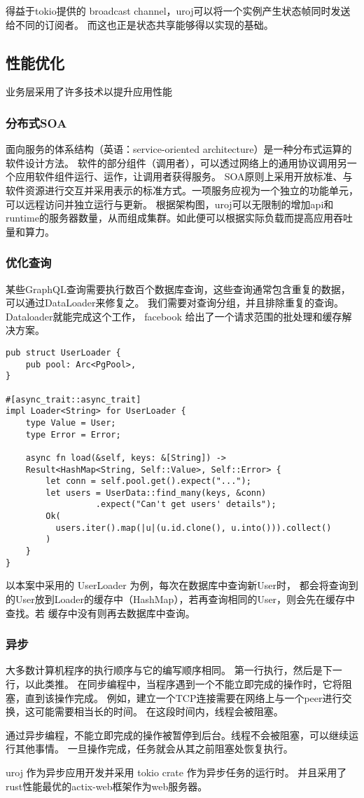 得益于tokio提供的 broadcast channel，uroj可以将一个实例产生状态帧同时发送给不同的订阅者。
而这也正是状态共享能够得以实现的基础。

\subsection{性能优化}
业务层采用了许多技术以提升应用性能
\subsubsection{分布式SOA}
面向服务的体系结构（英语：service-oriented architecture）是一种分布式运算的软件设计方法。
软件的部分组件（调用者），可以透过网络上的通用协议调用另一个应用软件组件运行、运作，让调用者获得服务。
SOA原则上采用开放标准、与软件资源进行交互并采用表示的标准方式。一项服务应视为一个独立的功能单元，可以远程访问并独立运行与更新。
根据架构图，uroj可以无限制的增加api和runtime的服务器数量，从而组成集群。如此便可以根据实际负载而提高应用吞吐量和算力。
\subsubsection{优化查询}
某些GraphQL查询需要执行数百个数据库查询，这些查询通常包含重复的数据，可以通过DataLoader来修复之。
我们需要对查询分组，并且排除重复的查询。Dataloader就能完成这个工作，
facebook 给出了一个请求范围的批处理和缓存解决方案。
\begin{lstlisting}
pub struct UserLoader {
    pub pool: Arc<PgPool>,
}

#[async_trait::async_trait]
impl Loader<String> for UserLoader {
    type Value = User;
    type Error = Error;

    async fn load(&self, keys: &[String]) -> 
    Result<HashMap<String, Self::Value>, Self::Error> {
        let conn = self.pool.get().expect("...");
        let users = UserData::find_many(keys, &conn)
                  .expect("Can't get users' details");
        Ok(
          users.iter().map(|u|(u.id.clone(), u.into())).collect()
        )
    }
}
\end{lstlisting}

以本案中采用的 UserLoader 为例，每次在数据库中查询新User时，
都会将查询到的User放到Loader的缓存中（HashMap），若再查询相同的User，则会先在缓存中查找。若
缓存中没有则再去数据库中查询。

\subsubsection{异步}
大多数计算机程序的执行顺序与它的编写顺序相同。
第一行执行，然后是下一行，以此类推。
在同步编程中，当程序遇到一个不能立即完成的操作时，它将阻塞，直到该操作完成。
例如，建立一个TCP连接需要在网络上与一个peer进行交换，这可能需要相当长的时间。
在这段时间内，线程会被阻塞。

通过异步编程，不能立即完成的操作被暂停到后台。线程不会被阻塞，可以继续运行其他事情。
一旦操作完成，任务就会从其之前阻塞处恢复执行。

uroj 作为异步应用开发并采用 tokio crate 作为异步任务的运行时。
并且采用了rust性能最优的actix-web框架作为web服务器。